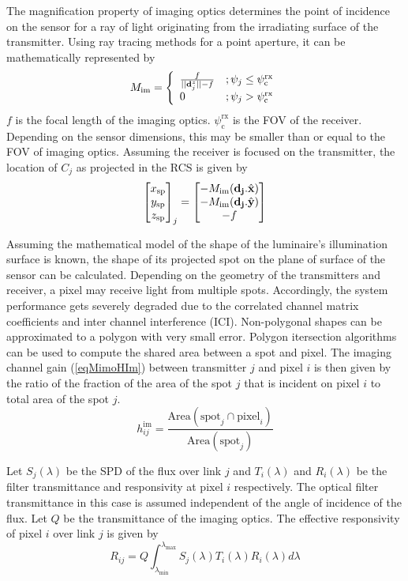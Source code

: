 The magnification property of imaging optics determines the point of incidence on the sensor for a ray of light originating from the irradiating surface of the transmitter. Using ray tracing methods for a point aperture, it can be mathematically represented by
\begin{equation}
	\label{eqOpMag}
	M_{\text{im}} = \left\{ \begin{array}{ll} \frac{f}{||{\bf{d}}_{j}^{z}||-f} &;  \psi_{j}\leq\psi_{\text{c}}^{\text{rx}} \\ 0 &;  \psi_{j}>\psi_{\text{c}}^{\text{rx}} \end{array} \right.
\end{equation}
$f$ is the focal length of the imaging optics. $\psi_{\text{c}}^{\text{rx}}$ is the FOV of the receiver. Depending on the sensor dimensions, this may be smaller than or equal to the FOV of imaging optics.
Assuming the receiver is focused on the transmitter, the location of $C_{j}$ as projected in the RCS is given by
\begin{equation}
	\label{eqLocSp}
	{ \left[ \begin{matrix} x_{\text{sp}}\\ y_{\text{sp}}\\ z_{\text{sp}} \end{matrix} \right] }_{j} = \left[ \begin{matrix} -M_{\text{im}}({\bf{d}_{j}}.{\hat{\bf{x}}})\\ -M_{\text{im}}({\bf{d}_{j}}.{\hat{\bf{y}})}\\ -f \end{matrix} \right]
	\end{equation}
	
Assuming the mathematical model of the shape of the luminaire's illumination surface is known, the shape of its projected spot on the plane of surface of the sensor can be calculated. Depending on the geometry of the transmitters and receiver, a pixel may receive light from multiple spots. Accordingly, the system performance gets severely degraded due to  the correlated channel matrix coefficients and inter channel interference (ICI). Non-polygonal shapes can be approximated to a polygon with very small error. Polygon itersection algorithms can be used to compute the shared area between a spot and pixel. The imaging channel gain (\ref{eqMimoHIm}) between transmitter $j$ and pixel $i$ is then given by the ratio of the fraction of the area of the spot $j$ that is incident on pixel $i$ to total area of the spot $j$.
\begin{equation}
	\label{eqMimoHIm}
	h^{\text{im}}_{ij} = \frac{\text{Area}(\text{spot}_{j}\cap \text{pixel}_{i})}{\text{Area}(\text{spot}_{j})}
\end{equation}

Let $S_{j}(\lambda)$ be the SPD of the flux over link $j$ and $T_{i}(\lambda)$ and $R_{i}(\lambda)$ be the filter transmittance and responsivity at pixel $i$ respectively. The optical filter transmittance in this case is assumed independent of the angle of incidence of the flux. Let $Q$ be the transmittance of the imaging optics. The effective responsivity of pixel $i$ over link $j$ is given by
\begin{equation} 
	\label{eqPxResp}
	R_{ij} = Q\int_{\lambda_{\text{min}}}^{\lambda_{\text{max}}}S_{j}(\lambda)T_{i}(\lambda)R_{i}(\lambda)d\lambda
\end{equation}

